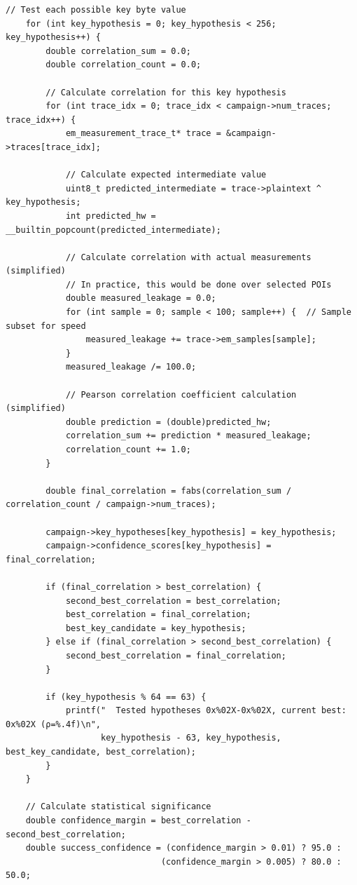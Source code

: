 \documentclass[11pt,a4paper]{article}
\theoremstyle{definition}
\begin{document}
\begin{lstlisting}[caption={Complete EM Attack Methodology Framework Implementation}]
    // Test each possible key byte value
    for (int key_hypothesis = 0; key_hypothesis < 256; key_hypothesis++) {
        double correlation_sum = 0.0;
        double correlation_count = 0.0;
        
        // Calculate correlation for this key hypothesis
        for (int trace_idx = 0; trace_idx < campaign->num_traces; trace_idx++) {
            em_measurement_trace_t* trace = &campaign->traces[trace_idx];
            
            // Calculate expected intermediate value
            uint8_t predicted_intermediate = trace->plaintext ^ key_hypothesis;
            int predicted_hw = __builtin_popcount(predicted_intermediate);
            
            // Calculate correlation with actual measurements (simplified)
            // In practice, this would be done over selected POIs
            double measured_leakage = 0.0;
            for (int sample = 0; sample < 100; sample++) {  // Sample subset for speed
                measured_leakage += trace->em_samples[sample];
            }
            measured_leakage /= 100.0;
            
            // Pearson correlation coefficient calculation (simplified)
            double prediction = (double)predicted_hw;
            correlation_sum += prediction * measured_leakage;
            correlation_count += 1.0;
        }
        
        double final_correlation = fabs(correlation_sum / correlation_count / campaign->num_traces);
        
        campaign->key_hypotheses[key_hypothesis] = key_hypothesis;
        campaign->confidence_scores[key_hypothesis] = final_correlation;
        
        if (final_correlation > best_correlation) {
            second_best_correlation = best_correlation;
            best_correlation = final_correlation;
            best_key_candidate = key_hypothesis;
        } else if (final_correlation > second_best_correlation) {
            second_best_correlation = final_correlation;
        }
        
        if (key_hypothesis % 64 == 63) {
            printf("  Tested hypotheses 0x%02X-0x%02X, current best: 0x%02X (ρ=%.4f)\n",
                   key_hypothesis - 63, key_hypothesis, best_key_candidate, best_correlation);
        }
    }
    
    // Calculate statistical significance
    double confidence_margin = best_correlation - second_best_correlation;
    double success_confidence = (confidence_margin > 0.01) ? 95.0 : 
                               (confidence_margin > 0.005) ? 80.0 : 50.0;
    

\end{lstlisting}
\end{document}
